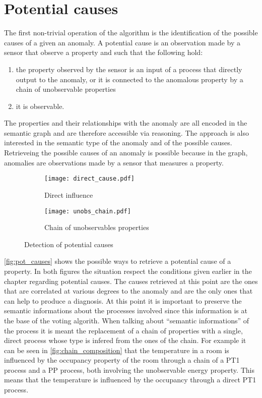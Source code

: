 \section{Potential causes}
The first non-trivial operation of the algorithm is the identification of the possible causes of a given an anomaly. A potential cause is an observation made by a sensor that observe a property and such that the following hold:
\begin{enumerate}
  \item the property observed by the sensor is an input of a process that directly output to the anomaly, or it is connected to the anomalous property by a chain of unobservable properties
  \item it is observable.
\end{enumerate}
The properties and their relationships with the anomaly are all encoded in the semantic graph and are therefore accessible via reasoning. The approach is also interested in the semantic type of the anomaly and of the possible causes.
Retrieveing the possible causes of an anomaly is possible because in the graph, anomalies are observations made by a sensor that measures a property.
\begin{figure}
  \begin{subfigure}[b]{\textwidth}
    \centering
      \texttt{[image: direct\_cause.pdf]}
      \caption{Direct influence}
      \label{fig:direct_influence}
  \end{subfigure}
  \begin{subfigure}[b]{\textwidth}
    \centering
      \texttt{[image: unobs\_chain.pdf]}
      \caption{Chain of unobservables properties}
      \label{fig:chain_unobs}
  \end{subfigure}
  \caption{Detection of potential causes}
  \label{fig:pot_causes}
\end{figure}
\autoref{fig:pot_causes} shows the possible ways to retrieve a potential cause of a property. In both figures the situation respect the conditions given earlier in the chapter regarding potential causes.
The causes retrieved at this point are the ones that are correlated at various degrees to the anomaly and are the only ones that can help to produce a diagnosis. At this point it is important to preserve the semantic informations about the processes involved since this information is at the base of the voting algorith. When talking about ``semantic informations'' of the process it is meant the replacement of a chain of properties with a single, direct process whose type is infered from the ones of the chain. For example it can be seen in \autoref{fig:chain_composition} that the temperature in a room is influenced by the occupancy property of the room through a chain of a PT1 process and a PP process, both involving the unobservable energy property. This means that the temperature is influenced by the occupancy through a direct PT1 process.
